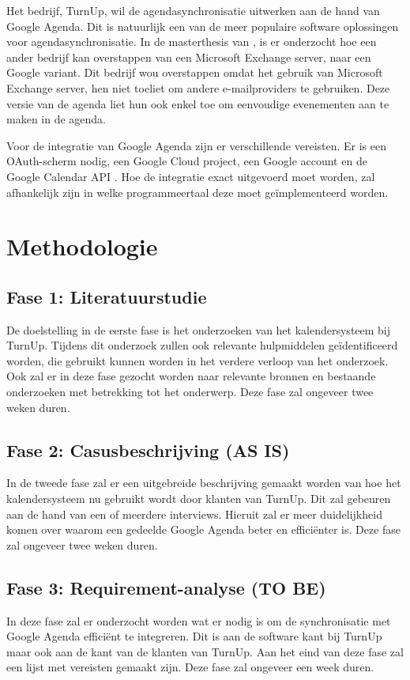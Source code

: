 Het bedrijf, TurnUp, wil de agendasynchronisatie uitwerken aan de hand van Google Agenda. Dit is natuurlijk een van de meer populaire software oplossingen voor agendasynchronisatie.
In de masterthesis van \textcite{Vladimir2016}, is er onderzocht hoe een ander bedrijf kan overstappen van een Microsoft Exchange server, naar een Google variant. 
Dit bedrijf wou overstappen omdat het gebruik van Microsoft Exchange server, hen niet toeliet om andere e-mailproviders te gebruiken. Deze versie van de agenda liet hun ook enkel toe om eenvoudige evenementen aan te maken in de agenda. 

Voor de integratie van Google Agenda zijn er verschillende vereisten. 
Er is een OAuth-scherm nodig, een Google Cloud project, een Google account en de Google Calendar API \autocite{Google2023a}.
Hoe de integratie exact uitgevoerd moet worden, zal afhankelijk zijn in welke programmeertaal deze moet geïmplementeerd worden. 

\section{Methodologie}%
\label{sec:methodologie}
\subsection{Fase 1: Literatuurstudie}
De doelstelling in de eerste fase is het onderzoeken van het kalendersysteem bij TurnUp. Tijdens dit onderzoek zullen ook relevante hulpmiddelen geïdentificeerd worden, die gebruikt kunnen worden in het verdere verloop van het onderzoek. Ook zal er in deze fase gezocht worden naar relevante bronnen en bestaande onderzoeken met betrekking tot het onderwerp.
Deze fase zal ongeveer twee weken duren. 

\subsection{Fase 2: Casusbeschrijving (AS IS)}
In de tweede fase zal er een uitgebreide beschrijving gemaakt worden van hoe het kalendersysteem nu gebruikt wordt door klanten van TurnUp. Dit zal gebeuren aan de hand van een of meerdere interviews. Hieruit zal er meer duidelijkheid komen over waarom een gedeelde Google Agenda beter en efficiënter is. 
Deze fase zal ongeveer twee weken duren.

\subsection{Fase 3: Requirement-analyse (TO BE)}
In deze fase zal er onderzocht worden wat er nodig is om de synchronisatie met Google Agenda efficiënt te integreren. Dit is aan de software kant bij TurnUp maar ook aan de kant van de klanten van TurnUp.
Aan het eind van deze fase zal een lijst met vereisten gemaakt zijn.
Deze fase zal ongeveer een week duren. 

